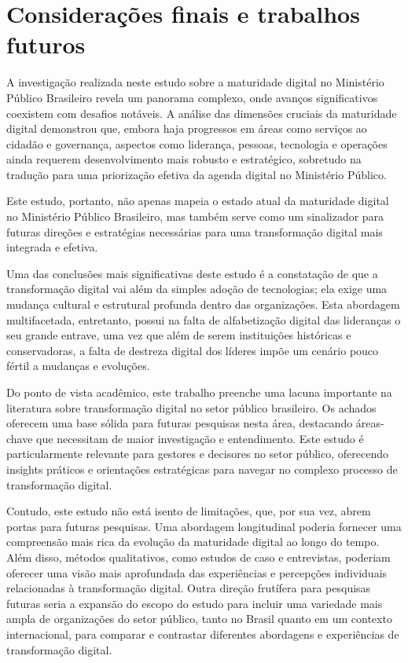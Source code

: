 \section{Considerações finais e trabalhos futuros}

A investigação realizada neste estudo sobre a maturidade digital no Ministério Público Brasileiro revela um panorama complexo, onde avanços significativos coexistem com desafios notáveis. A análise das dimensões cruciais da maturidade digital demonstrou que, embora haja progressos em áreas como serviços ao cidadão e governança, aspectos como liderança, pessoas, tecnologia e operações ainda requerem desenvolvimento mais robusto e estratégico, sobretudo na tradução para uma priorização efetiva da agenda digital no Ministério Público.

Este estudo, portanto, não apenas mapeia o estado atual da maturidade digital no Ministério Público Brasileiro, mas também serve como um sinalizador para futuras direções e estratégias necessárias para uma transformação digital mais integrada e efetiva.

Uma das conclusões mais significativas deste estudo é a constatação de que a transformação digital vai além da simples adoção de tecnologias; ela exige uma mudança cultural e estrutural profunda dentro das organizações. Esta abordagem multifacetada, entretanto, possui na falta de alfabetização digital das lideranças o seu grande entrave, uma vez que além de serem instituições históricas e conservadoras, a falta de destreza digital dos líderes impõe um cenário pouco fértil a mudanças e evoluções.

Do ponto de vista acadêmico, este trabalho preenche uma lacuna importante na literatura sobre transformação digital no setor público brasileiro. Os achados oferecem uma base sólida para futuras pesquisas nesta área, destacando áreas-chave que necessitam de maior investigação e entendimento. Este estudo é particularmente relevante para gestores e decisores no setor público, oferecendo insights práticos e orientações estratégicas para navegar no complexo processo de transformação digital.

Contudo, este estudo não está isento de limitações, que, por sua vez, abrem portas para futuras pesquisas. Uma abordagem longitudinal poderia fornecer uma compreensão mais rica da evolução da maturidade digital ao longo do tempo. Além disso, métodos qualitativos, como estudos de caso e entrevistas, poderiam oferecer uma visão mais aprofundada das experiências e percepções individuais relacionadas à transformação digital. Outra direção frutífera para pesquisas futuras seria a expansão do escopo do estudo para incluir uma variedade mais ampla de organizações do setor público, tanto no Brasil quanto em um contexto internacional, para comparar e contrastar diferentes abordagens e experiências de transformação digital.

